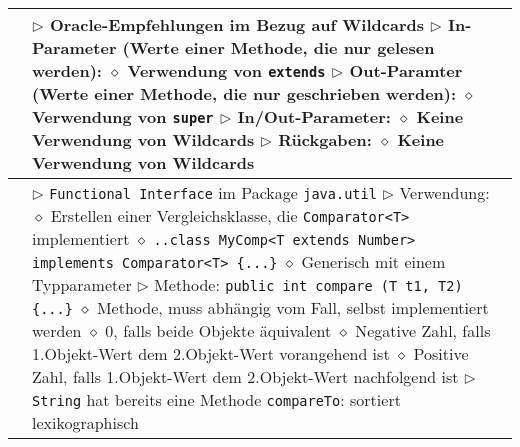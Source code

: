 \begin{longtable}{ | p{} p{} | }
	\makecell[l]{Empfehlungen} & \makecell[l]{
	$\rhd$ Oracle-Empfehlungen im Bezug auf Wildcards \\
	$\rhd$ In-Parameter (Werte einer Methode, die nur gelesen werden): \\ 
	\hspace{0.4cm} $\diamond$ Verwendung von \texttt{extends} \\
	$\rhd$ Out-Paramter (Werte einer Methode, die nur geschrieben werden): \\
	\hspace{0.4cm} $\diamond$ Verwendung von \texttt{super} \\
	$\rhd$ In/Out-Parameter: \\
	\hspace{0.4cm} $\diamond$ Keine Verwendung von Wildcards \\
	$\rhd$ Rückgaben: \\
	\hspace{0.4cm} $\diamond$ Keine Verwendung von Wildcards} \\ \hline

	\makecell[l]{Interface Comparator} & \makecell[l]{
	$\rhd$  \texttt{Functional Interface} im Package \texttt{java.util} \\
	$\rhd$ Verwendung: \\
	\hspace{0.4cm} $\diamond$ Erstellen einer Vergleichsklasse, die \texttt{Comparator<T>} implementiert \\
	\hspace{0.4cm} $\diamond$ \texttt{..class MyComp<T extends Number> implements Comparator<T> \{...\}} \\
	\hspace{0.4cm} $\diamond$ Generisch mit einem Typparameter \\
	$\rhd$ Methode: \texttt{public int compare (T t1, T2) \{...\}} \\
	\hspace{0.4cm} $\diamond$ Methode, muss abhängig vom Fall, selbst implementiert werden \\
	\hspace{0.4cm} $\diamond$ 0, falls beide Objekte äquivalent \\
	\hspace{0.4cm} $\diamond$ Negative Zahl, falls 1.Objekt-Wert dem 2.Objekt-Wert vorangehend ist \\
	\hspace{0.4cm} $\diamond$ Positive Zahl, falls 1.Objekt-Wert dem 2.Objekt-Wert nachfolgend ist \\
	$\rhd$ \texttt{String} hat bereits eine Methode \texttt{compareTo}: sortiert lexikographisch }  \\ \hline


\end{longtable}
